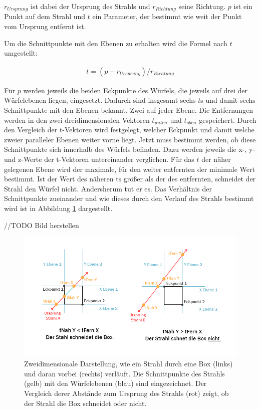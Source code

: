 $r_{Ursprung}$ ist dabei der Ursprung des Strahls und $r_{Richtung}$ seine Richtung. $p$ ist ein Punkt auf dem Strahl und $t$ ein Parameter, der bestimmt wie weit der Punkt vom Ursprung entfernt ist.

Um die Schnittpunkte mit den Ebenen zu erhalten wird die Formel nach $t$ umgestellt:

\begin{align}
t=(p-r_{Ursprung})/r_{Richtung}
\end{align}

Für $p$ werden jeweils die beiden Eckpunkte des Würfels, die jeweils auf drei der Würfelebenen liegen, eingesetzt.
Dadurch sind insgesamt sechs $t$s und damit sechs Schnittpunkte mit den Ebenen bekannt. Zwei auf jeder Ebene. Die Entfernungen werden in den zwei dreidimensionalen Vektoren $t_{unten}$ und $t_{oben}$ gespeichert. Durch den Vergleich der t-Vektoren wird festgelegt, welcher Eckpunkt und damit welche zweier paralleler Ebenen weiter vorne liegt. 
Jetzt muss bestimmt werden, ob diese Schnittpunkte sich innerhalb des Würfels befinden.
Dazu werden jeweils die x-, y- und z-Werte der t-Vektoren untereinander verglichen. Für das $t$ der näher gelegenen Ebene wird der maximale, für den weiter entfernten der minimale Wert bestimmt. Ist der Wert des näheren ts größer als der des entfernten, schneidet der Strahl den Würfel nicht. Andersherum tut er es.
Das Verhältnis der Schnittpunkte zueinander und wie dieses durch den Verlauf des Strahls bestimmt wird ist in Abbildung \ref{img:rayBoxHit} dargestellt.

//TODO
Bild herstellen

\begin{figure}
	\centering
	\includegraphics[width=0.9\linewidth]{images/rayBox.png}
	\caption{Zweidimensionale Darstellung, wie ein Strahl durch eine Box (links) und daran vorbei (rechts) verläuft. Die Schnittpunkte des Strahls (gelb) mit den Würfelebenen (blau) sind eingezeichnet. Der Vergleich derer Abstände zum Ursprung des Strahls (rot) zeigt, ob der Strahl die Box schneidet oder nicht.}
	\label{img:rayBoxHit}
\end{figure}

